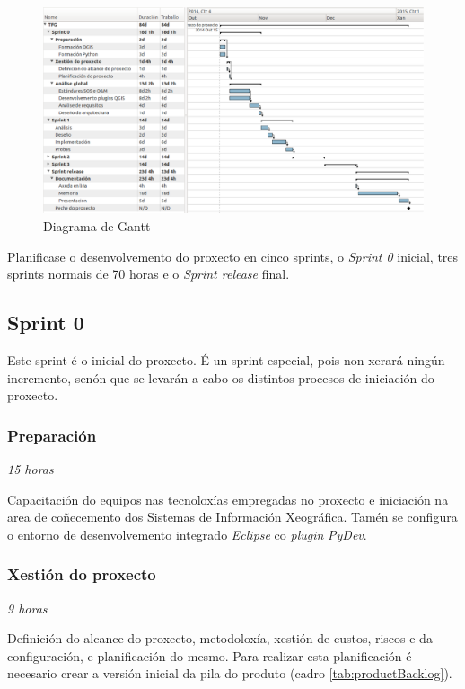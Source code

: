 \begin{figure}
\centering
\includegraphics[width=1.0\textwidth]{images/gantt.eps}
\caption{Diagrama de Gantt}
\label{fig:gantt}
\end{figure}

Planificase o desenvolvemento do proxecto en cinco sprints, o \emph{Sprint 0} inicial, tres sprints normais de 70 horas e o \emph{Sprint release} final.

\subsection{Sprint 0}
Este sprint é o inicial do proxecto. É un sprint especial, pois non xerará ningún incremento, senón que se levarán a cabo os distintos procesos de iniciación do proxecto.

\subsubsection{Preparación}
\textit{15 horas}

Capacitación do equipos nas tecnoloxías empregadas no proxecto e iniciación na area de coñecemento dos Sistemas de Información Xeográfica.
Tamén se configura o entorno de desenvolvemento integrado \emph{Eclipse} co \emph{plugin} \emph{PyDev}.

\subsubsection{Xestión do proxecto}
\textit{9 horas}

Definición do alcance do proxecto, metodoloxía, xestión de custos, riscos e da configuración, e planificación do mesmo. Para realizar esta planificación é necesario crear a versión inicial da pila do produto (cadro \ref{tab:productBacklog}).

